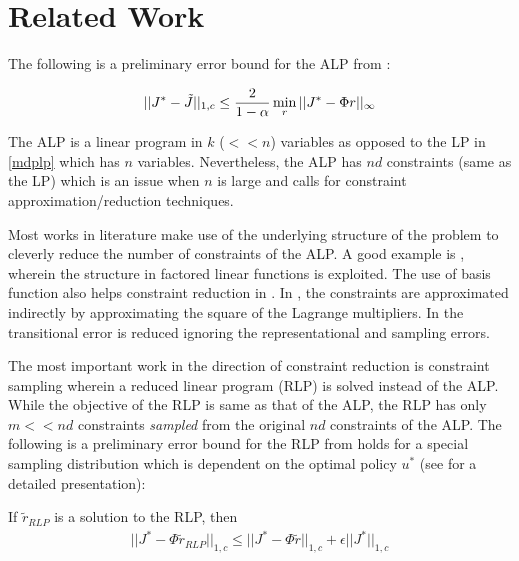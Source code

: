 \section{Related Work}
The following is a preliminary error bound for the ALP from \cite{ALP}:
\begin{theorem}
\begin{align*}
||J^*-\tilde{J}||_{1,c}\leq \frac{2}{1-\alpha}\min_{r}||J^*-\Phi r||_\infty
\end{align*}
\end{theorem}
The ALP is a linear program in $k$ ($<<n$) variables as opposed to the LP in \eqref{mdplp} which has $n$ variables.
Nevertheless, the ALP has $nd$ constraints (same as the LP) which is an issue when $n$ is large and calls for constraint approximation/reduction techniques.

Most works in literature make use of the underlying structure of the problem to cleverly reduce the number of constraints of the ALP. A good example is \cite{gkp}, wherein the structure in factored linear functions is exploited. The use of basis function also helps constraint reduction in \cite{Mor-Kum}. In \cite{ALP-Bor}, the constraints are approximated indirectly by approximating the square of the Lagrange multipliers. In \cite{petrik} the transitional error is reduced ignoring the representational and sampling errors.\par
The most important work in the direction of constraint reduction is constraint sampling \cite{CS} wherein a reduced linear program (RLP) is solved instead of the ALP. While the objective of the RLP is same as that of the ALP, the RLP has only $m<<nd$ constraints \emph{sampled} from the original $nd$ constraints of the ALP.  The following is a preliminary error bound for the RLP from \cite{CS} holds for a special sampling distribution which is dependent on the optimal policy $u^*$ (see \cite{CS} for a detailed presentation):
\begin{theorem}
If $\tilde{r}_{RLP}$ is a solution to the RLP, then
\begin{align*}
||J^*-\Phi\tilde{r}_{RLP}||_{1,c}\leq ||J^*-\Phi\tilde{r}||_{1,c}+\epsilon ||J^*||_{1,c}
\end{align*}
\end{theorem}
